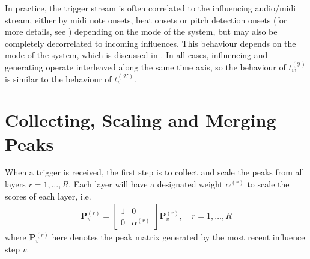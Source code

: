 In practice, the trigger stream is often correlated to the influencing audio/midi stream, either by midi note onsets, beat onsets or pitch detection onsets (for more details, see \cite{borg_2019}) depending on the mode of the system, but may also be completely decorrelated to incoming influences. This behaviour depends on the mode of the system, which is discussed in \cite{somaxsoftware2021}. In all cases, influencing and generating operate interleaved along the same time axis, so the behaviour of $t^{(\mathcal Y)}_w$ is similar to the behaviour of $t^{(\mathcal K)}_v$.


\section{Collecting, Scaling and Merging Peaks}\label{sec:3-generate-merge}
When a trigger is received, the first step is to collect and scale the peaks from all layers $r = 1, \dots, R$. Each layer will have a designated weight $\alpha^{(r)}$ to scale the scores of each layer, i.e.
\begin{align}
	\bm P^{(r)}_w = \begin{bmatrix} 1 & 0 \\ 0 & \alpha^{(r)} \end{bmatrix} \bm P^{(r)}_v,
	\quad r = 1, \dots, R
\end{align}
where $\bm P^{(r)}_v$ here denotes the peak matrix generated by the most recent influence step $v$.

